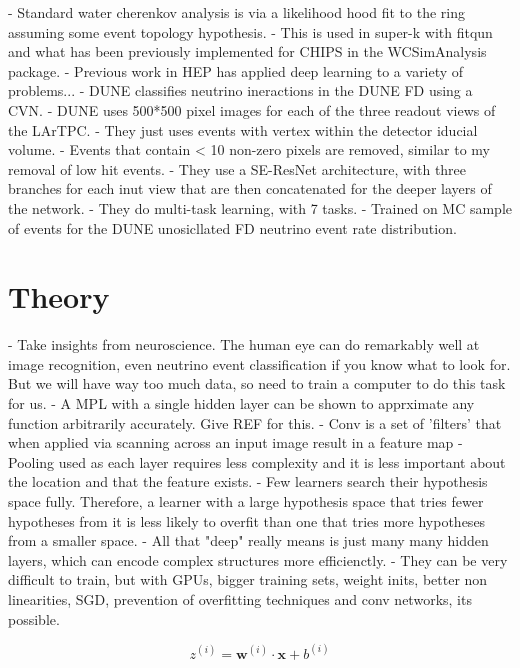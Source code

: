 - Standard water cherenkov analysis is via a likelihood hood fit to the ring assuming some event topology hypothesis.
- This is used in super-k with fitqun and what has been previously implemented for CHIPS in the WCSimAnalysis package.
- Previous work in HEP has applied deep learning to a variety of problems...
- DUNE classifies neutrino ineractions in the DUNE FD using a CVN.
- DUNE uses 500*500 pixel images for each of the three readout views of the LArTPC.
- They just uses events with vertex within the detector iducial volume.
- Events that contain < 10 non-zero pixels are removed, similar to my removal of low hit events.
- They use a SE-ResNet architecture, with three branches for each inut view that are then concatenated for the deeper layers of the network.
- They do multi-task learning, with 7 tasks.
- Trained on MC sample of events for the DUNE unosicllated FD neutrino event rate distribution.

\section{Theory} %
\label{sec:cvn_theory} %
- Take insights from neuroscience. The human eye can do remarkably well at image recognition, even neutrino event classification if
you know what to look for. But we will have way too much data, so need to train a computer to do this task for us.
- A MPL with a single hidden layer can be shown to apprximate any function arbitrarily accurately. Give REF for this.
- Conv is a set of 'filters' that when applied via scanning across an input image result in a feature map
- Pooling used as each layer requires less complexity and it is less important about the location and that the feature exists.
- Few learners search their hypothesis space fully. Therefore, a learner with a large hypothesis space that tries fewer hypotheses from it is less likely to overfit than one that tries more hypotheses from a smaller space.
- All that "deep" really means is just many many hidden layers, which can encode complex structures more efficienctly.
- They can be very difficult to train, but with GPUs, bigger training sets, weight inits, better non linearities, SGD, prevention of overfitting techniques and conv networks, its possible.

\begin{equation} %
    z^{(i)}=\boldsymbol{w}^{(i)}\cdot\boldsymbol{x}+b^{(i)}
\end{equation}

